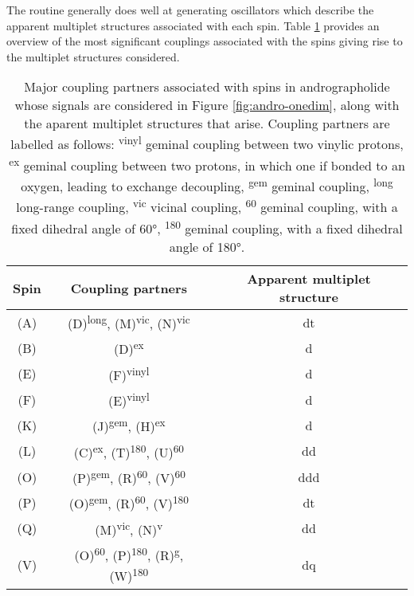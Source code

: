 The routine generally does well at generating oscillators which describe the
apparent multiplet structures associated with each spin. Table
\ref{tab:andro-multiplets} provides an overview of the most significant
couplings associated with the spins giving rise to the multiplet structures
considered.
\begin{table}[h!]
\centering
\begin{tabular}{c c c}
\hline
Spin  & Coupling partners & Apparent multiplet structure \\
\hline
(A) & (D)\textsuperscript{long}, (M)\textsuperscript{vic}, (N)\textsuperscript{vic} & dt \\
(B) & (D)\textsuperscript{ex} & d \\
(E) & (F)\textsuperscript{vinyl}\note{, ...} & d\note{...} \\
(F) & (E)\textsuperscript{vinyl}\note{, ...} & d\note{...} \\
(K) & (J)\textsuperscript{gem}, (H)\textsuperscript{ex} & d \\
(L) & (C)\textsuperscript{ex}, (T)\textsuperscript{180}, (U)\textsuperscript{60} & dd \\
(O) & (P)\textsuperscript{gem}, (R)\textsuperscript{60}, (V)\textsuperscript{60} & ddd \\
(P) & (O)\textsuperscript{gem}, (R)\textsuperscript{60}, (V)\textsuperscript{180} & dt \\
(Q) & (M)\textsuperscript{vic}, (N)\textsuperscript{v} & dd \\
(V) & (O)\textsuperscript{60}, (P)\textsuperscript{180}, (R)\textsuperscript{g}, (W)\textsuperscript{180} & dq \\
\hline
\end{tabular}
\caption[
    Major coupling partners associated with spins in andrographolide whose
    signals are considered in Figure \ref{fig:andro-onedim}.
]{
    Major coupling partners associated with spins in andrographolide whose
    signals are considered in Figure \ref{fig:andro-onedim}, along with the
    aparent multiplet structures that arise.
    Coupling partners are labelled as follows:
    \textsuperscript{vinyl} geminal coupling between two vinylic protons,
    \textsuperscript{ex} geminal coupling between two protons, in which one
    if bonded to an oxygen, leading to exchange decoupling,
    \textsuperscript{gem} geminal coupling,
    \textsuperscript{long} long-range coupling,
    \textsuperscript{vic} vicinal coupling,
    \textsuperscript{60} geminal coupling, with a fixed dihedral angle of \ang{60},
    \textsuperscript{180} geminal coupling, with a fixed dihedral angle of \ang{180}.
}
\label{tab:andro-multiplets}
\end{table}
